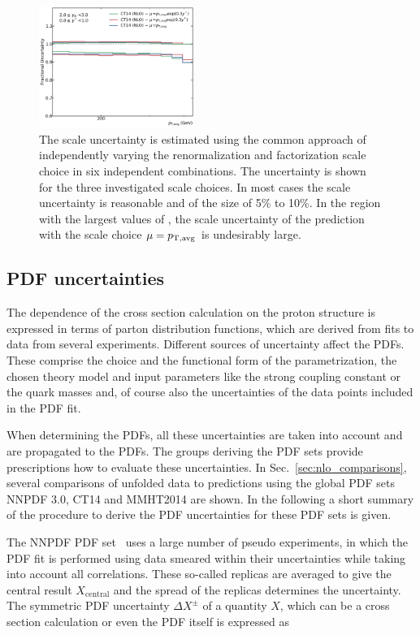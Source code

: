 \begin{figure}[htp]
    \includegraphics[width=0.45\textwidth]{figures/theory/scale_uncert_comp_yb2ys0.pdf}
    \caption[Scale Uncertainties of NLO calculation]{The scale uncertainty is estimated using the common approach of
        independently varying the renormalization and factorization scale
        choice in six independent combinations. The uncertainty is shown for the
        three investigated scale choices. In most cases the scale uncertainty is
        reasonable and of the size of 5\% to 10\%. In the region with the
        largest values of \ystar, the scale uncertainty of the prediction with
    the scale choice $\mu=p_{\mathrm{T,avg}}$ is undesirably large.}
    \label{fig:scale_uncertainties}
\end{figure}

\subsection{PDF uncertainties}

The dependence of the cross section calculation on the proton structure is
expressed in terms of parton distribution functions, which are derived from
fits to data from several experiments. Different sources of
uncertainty affect the PDFs. These comprise the choice and the
functional form of the parametrization, the chosen theory model and input
parameters like the strong coupling constant \as or the quark masses and, of
course also the uncertainties of the data points included in the PDF fit.

When determining the PDFs, all these uncertainties are taken into account and
are propagated to the PDFs. The groups deriving the PDF sets provide
prescriptions how to evaluate these uncertainties. In
Sec.~\ref{sec:nlo_comparisons}, several comparisons of unfolded data to predictions using the
global PDF sets NNPDF 3.0, CT14 and MMHT2014 are shown. In the following a short
summary of the procedure to derive the PDF uncertainties for these PDF sets is
given.

The NNPDF PDF set~\cite{Ball:2014uwa} uses a large number of pseudo experiments, in which the PDF
fit is performed using data smeared within their uncertainties while taking into
account all correlations. These so-called replicas are averaged to give the
central result $X_\mathrm{central}$ and the spread of the replicas determines the uncertainty. The
symmetric PDF uncertainty $\Delta X^\pm$ of a quantity $X$, which can be a cross section calculation or
even the PDF itself is expressed as

